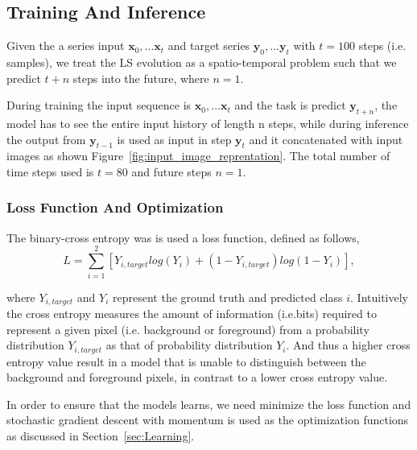 \documentclass{WitsPhysicsReport}
\begin{document}
\subsection{Training And Inference}
\label{sec:training_and_inference}

Given the a series input ${\mathbf{x}_{0}, ...\mathbf{x}_{t}}$ and target series ${\mathbf{y}_{0}, ...\mathbf{y}_{t}}$ with $t=100$ steps (i.e. samples), we treat the LS evolution as a spatio-temporal problem such that we predict $t+n$ steps into the future, where $n=1$. 

During training the input sequence is ${\mathbf{x}_{0}, ...\mathbf{x}_{t}}$ and the task is predict ${\mathbf{y}_{t+n}}$, the model has to see the entire input history of length n steps, while during inference the output from ${\mathbf{y}_{t-1}}$ is used as input in step ${\mathbf{y}_{t}}$ and it  concatenated with input images as shown
Figure~\ref{fig:input_image_reprentation}. The total number of time steps used is $t=80$ and future steps $n=1$. 


\subsubsection{Loss Function And Optimization}
\label{sec:loss_function}

The binary-cross entropy was is used a loss function, defined as follows,
\begin{equation}
    L = \sum_{i=1}^{2} [Y_{i,target} log(Y_{i}) + (1 - Y_{i,target}) log(1 - Y_{i})],
\end{equation}


where $Y_{i,target}$ and $Y_{i}$ represent the ground truth and predicted class $i$. Intuitively the cross entropy measures the amount of information (i.e.bits) required to represent a given pixel (i.e. background or foreground) from a probability distribution $Y_{i,target}$  as that of probability distribution $Y_{i}$.  And thus a higher cross entropy value result in a model that is unable to distinguish between the background and foreground pixels, in contrast to a lower cross entropy value.

In order to ensure that the models learns, we need minimize the loss function and stochastic gradient descent with momentum is used as the optimization functions as discussed in Section~\ref{sec:Learning}. 
\end{document}
